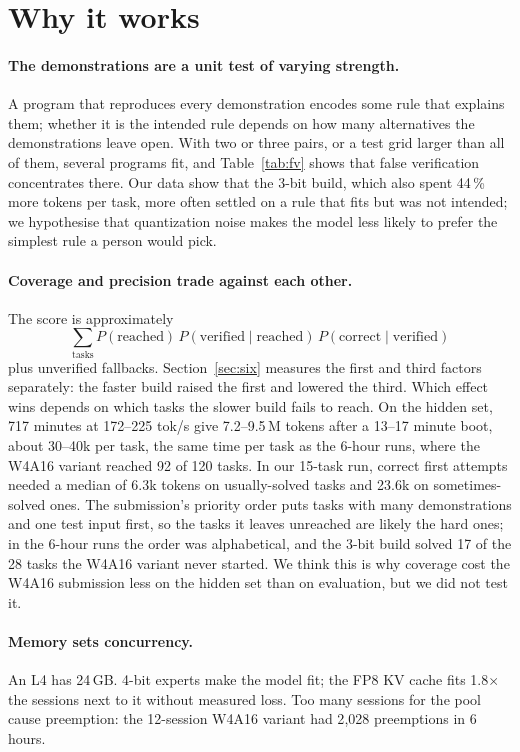 \documentclass[11pt]{article}
\begin{document}
\section{Why it works}
\paragraph{The demonstrations are a unit test of varying strength.} A program that reproduces every demonstration encodes some rule that explains them; whether it is the intended rule depends on how many alternatives the demonstrations leave open. With two or three pairs, or a test grid larger than all of them, several programs fit, and Table~\ref{tab:fv} shows that false verification concentrates there. Our data show that the 3-bit build, which also spent 44\,\% more tokens per task, more often settled on a rule that fits but was not intended; we hypothesise that quantization noise makes the model less likely to prefer the simplest rule a person would pick.

\paragraph{Coverage and precision trade against each other.} The score is approximately
\[
\sum_{\text{tasks}} P(\text{reached})\,P(\text{verified}\mid\text{reached})\,P(\text{correct}\mid\text{verified})
\]
plus unverified fallbacks. Section~\ref{sec:six} measures the first and third factors separately: the faster build raised the first and lowered the third. Which effect wins depends on which tasks the slower build fails to reach. On the hidden set, 717 minutes at 172--225 tok/s give 7.2--9.5\,M tokens after a 13--17 minute boot, about 30--40k per task, the same time per task as the 6-hour runs, where the W4A16 variant reached 92 of 120 tasks. In our 15-task run, correct first attempts needed a median of 6.3k tokens on usually-solved tasks and 23.6k on sometimes-solved ones. The submission's priority order puts tasks with many demonstrations and one test input first, so the tasks it leaves unreached are likely the hard ones; in the 6-hour runs the order was alphabetical, and the 3-bit build solved 17 of the 28 tasks the W4A16 variant never started. We think this is why coverage cost the W4A16 submission less on the hidden set than on evaluation, but we did not test it.

\paragraph{Memory sets concurrency.} An L4 has 24\,GB. 4-bit experts make the model fit; the FP8 KV cache fits 1.8$\times$ the sessions next to it without measured loss. Too many sessions for the pool cause preemption: the 12-session W4A16 variant had 2{,}028 preemptions in 6 hours.
\end{document}
